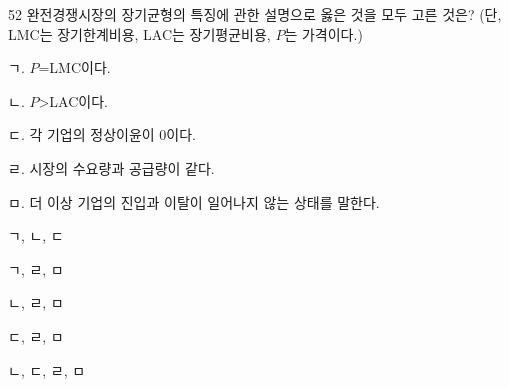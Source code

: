 \begin{question}{52}
완전경쟁시장의 장기균형의 특징에 관한 설명으로 옳은 것을 모두 고른 것은? (단, LMC는 장기한계비용, LAC는 장기평균비용, $P$는 가격이다.)
\begin{framedtext}
ㄱ. $P$=LMC이다. \par
ㄴ. $P$>LAC이다. \par
ㄷ. 각 기업의 정상이윤이 0이다. \par
ㄹ. 시장의 수요량과 공급량이 같다. \par
ㅁ. 더 이상 기업의 진입과 이탈이 일어나지 않는 상태를 말한다. \par
\end{framedtext}
\begin{choices}
  \item ㄱ, ㄴ, ㄷ
  \item ㄱ, ㄹ, ㅁ
  \item ㄴ, ㄹ, ㅁ
  \item ㄷ, ㄹ, ㅁ
  \item ㄴ, ㄷ, ㄹ, ㅁ
\end{choices}
\end{question}
